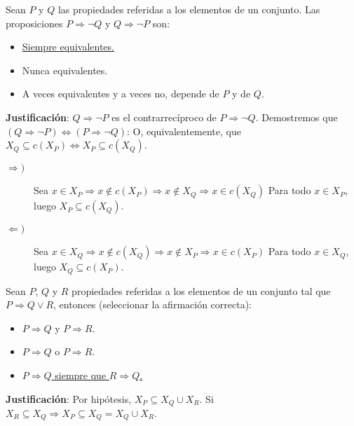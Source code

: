 \newpage
\begin{ejercicio}
    Sean $P$ y $Q$ las propiedades referidas a los elementos de un conjunto. Las proposiciones $P \Rightarrow \neg Q$ y $Q \Rightarrow \neg P$ son:
    \begin{itemize}
        \item \underline{Siempre equivalentes.}
        \item Nunca equivalentes.
        \item A veces equivalentes y a veces no, depende de $P$ y de $Q$.
    \end{itemize}

    \noindent
    \textbf{Justificación}:
    $Q \Rightarrow \neg P$ es el contrarrecíproco de $P \Rightarrow \neg Q$.\newline
    Demostremos que $(Q \Rightarrow \neg P) \Leftrightarrow (P \Rightarrow \neg Q)$:\newline
    O, equivalentemente, que $X_Q \subseteq c(X_P) \Leftrightarrow X_P \subseteq c(X_Q)$.
    \begin{description}
        \item [$\Rightarrow)$]
            Sea $ x \in X_P \Rightarrow x \notin c(X_P) \Rightarrow x \notin X_Q \Rightarrow x \in c(X_Q)$\newline
            Para todo $x \in X_P$, luego $X_P \subseteq c(X_Q)$.
        \item [$\Leftarrow)$]
            Sea $ x \in X_Q \Rightarrow x \notin c(X_Q) \Rightarrow x \notin X_P \Rightarrow x \in c(X_P)$\newline
            Para todo $x \in X_Q$, luego $X_Q \subseteq c(X_P)$.
    \end{description}
\end{ejercicio}

\begin{ejercicio}
    Sean $P$, $Q$ y $R$ propiedades referidas a los elementos de un conjunto tal que $P \Rightarrow Q \lor R$, entonces (seleccionar la afirmación correcta):
    \begin{itemize}
        \item $P \Rightarrow Q$ y $P \Rightarrow R$.
        \item $P \Rightarrow Q$ o $P \Rightarrow R$.
        \item \underline{$P \Rightarrow Q$ siempre que $R \Rightarrow Q$.}
    \end{itemize}

    \noindent
    \textbf{Justificación}:
    Por hipótesis, $X_P \subseteq X_Q \cup X_R$.\newline
    Si $X_R \subseteq X_Q \Rightarrow X_P \subseteq X_Q = X_Q \cup X_R$.

\end{ejercicio}

\newpage
\resetearcontador
